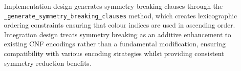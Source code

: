 Implementation design generates symmetry breaking clauses through the \texttt{\_generate\_\-symmetry\_\-breaking\_\-clauses} method, which creates lexicographic ordering constraints ensuring that colour indices are used in ascending order. Integration design treats symmetry breaking as an additive enhancement to existing CNF encodings rather than a fundamental modification, ensuring compatibility with various encoding strategies whilst providing consistent symmetry reduction benefits.